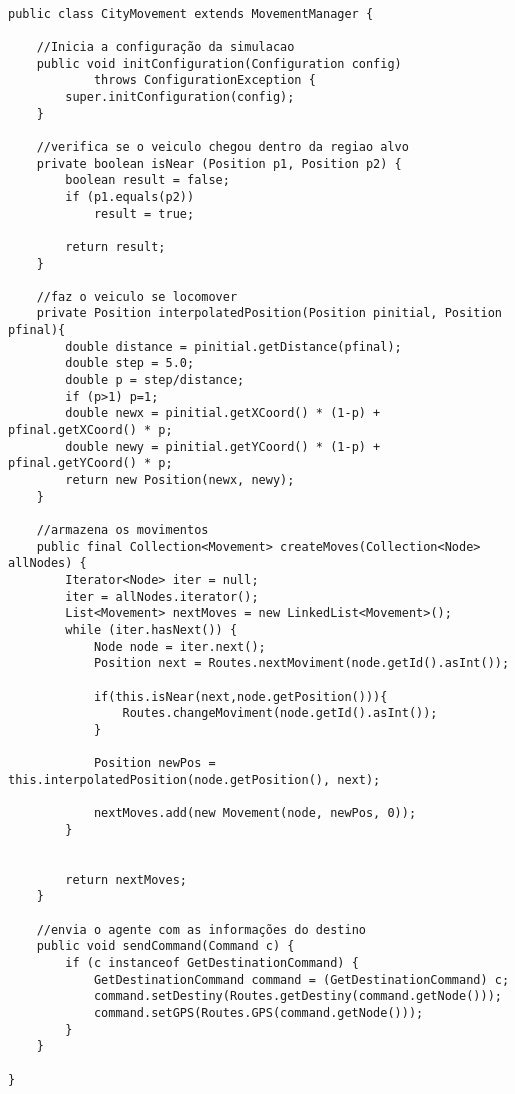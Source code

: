 \begin{lstlisting}

public class CityMovement extends MovementManager {
	
	//Inicia a configuração da simulacao
	public void initConfiguration(Configuration config)
			throws ConfigurationException {
		super.initConfiguration(config);
	}

	//verifica se o veiculo chegou dentro da regiao alvo
	private boolean isNear (Position p1, Position p2) {
		boolean result = false;
		if (p1.equals(p2))
			result = true;
		
		return result;
	}
	
	//faz o veiculo se locomover
	private Position interpolatedPosition(Position pinitial, Position pfinal){
		double distance = pinitial.getDistance(pfinal);
		double step = 5.0;
		double p = step/distance;
		if (p>1) p=1;
		double newx = pinitial.getXCoord() * (1-p) + pfinal.getXCoord() * p;
		double newy = pinitial.getYCoord() * (1-p) + pfinal.getYCoord() * p;
		return new Position(newx, newy);
	}
	
	//armazena os movimentos 
	public final Collection<Movement> createMoves(Collection<Node> allNodes) {
		Iterator<Node> iter = null;
		iter = allNodes.iterator();
		List<Movement> nextMoves = new LinkedList<Movement>();
		while (iter.hasNext()) {
			Node node = iter.next();
			Position next = Routes.nextMoviment(node.getId().asInt());
			
			if(this.isNear(next,node.getPosition())){
				Routes.changeMoviment(node.getId().asInt());
			}	
			
			Position newPos = this.interpolatedPosition(node.getPosition(), next);
			
			nextMoves.add(new Movement(node, newPos, 0));
		}
		
		
		return nextMoves;
	}
	
	//envia o agente com as informações do destino
	public void sendCommand(Command c) {
		if (c instanceof GetDestinationCommand) {
			GetDestinationCommand command = (GetDestinationCommand) c;
			command.setDestiny(Routes.getDestiny(command.getNode()));
			command.setGPS(Routes.GPS(command.getNode()));
		}
	}
	
}
\end{lstlisting}
